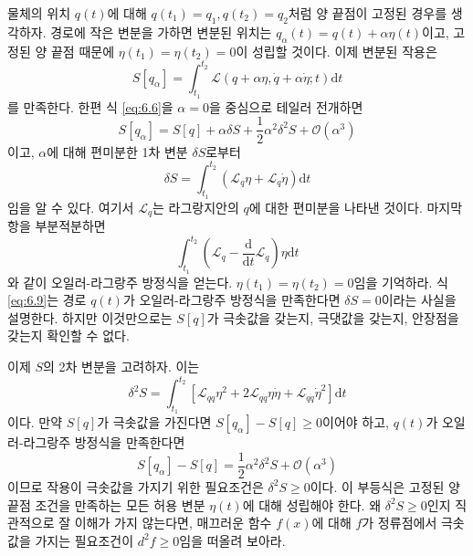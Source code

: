 \documentclass[chapter, oneside, b5paper]{oblivoir}
\theoremstyle{plain}
\theoremstyle{definition}
\theoremstyle{remark}
\begin{document}
물체의 위치 $q(t)$에 대해 $q(t_1) = q_1, q(t_2) = q_2$처럼 양 끝점이 고정된 경우를 생각하자. 경로에 작은 변분을 가하면 변분된 위치는 $q_{\alpha}(t) = q(t) + \alpha \eta(t)$이고, 고정된 양 끝점 때문에 $\eta(t_1) = \eta(t_2)=0$이 성립할 것이다. 이제 변분된 작용은
\begin{equation}
    S[q_\alpha] = \int_{t_1}^{t_2} \mathcal{L}(q+\alpha \eta, \dot{q}+\alpha \dot{\eta} ; t) \mathrm{d}t
    \label{eq:6.6}
\end{equation}
를 만족한다. 한편 식 \ref{eq:6.6}을 $\alpha = 0$을 중심으로 테일러 전개하면
\begin{equation}
    S[q_{\alpha}] = S[q] + \alpha \delta S + \frac{1}{2} \alpha^2 \delta^2S + \mathcal{O}(\alpha^3)
\end{equation}
이고, $\alpha$에 대해 편미분한 1차 변분 $\delta S$로부터
\begin{equation}
    \delta S = \int_{t_1}^{t_2} (\mathcal{L}_q \eta + \mathcal{L}_{\dot{q}} \dot{\eta}) \mathrm{d}t
\end{equation}
임을 알 수 있다. 여기서 $\mathcal{L}_q$는 라그랑지안의 $q$에 대한 편미분을 나타낸 것이다. 마지막 항을 부분적분하면
\begin{equation}
    \int_{t_1}^{t_2} \left(\mathcal{L}_q  - \frac{\mathrm{d}}{\mathrm{d}t}\mathcal{L}_{\dot{q}} \right) \eta \mathrm{d}t
    \label{eq:6.9}
\end{equation}
와 같이 오일러-라그랑주 방정식을 얻는다. $\eta(t_1) = \eta(t_2)=0$임을 기억하라. 식 \ref{eq:6.9}는 경로 $q(t)$가 오일러-라그랑주 방정식을 만족한다면 $\delta S = 0$이라는 사실을 설명한다. 하지만 이것만으로는 $S[q]$가 극솟값을 갖는지, 극댓값을 갖는지, 안장점을 갖는지 확인할 수 없다.

이제 $S$의 2차 변분을 고려하자. 이는
\begin{equation}
    \delta^2 S = \int_{t_1}^{t_2} [\mathcal{L}_{qq} \eta^2 + 2\mathcal{L}_{q\dot{q}} \eta \dot{\eta} + \mathcal{L}_{\dot{q}\dot{q}}\dot{\eta}^
    2] \mathrm{d}t
    \label{eq:6.10}
\end{equation}
이다. 만약 $S[q]$가 극솟값을 가진다면 $S[q_{\alpha}] - S[q] \geq 0$이어야 하고, $q(t)$가 오일러-라그랑주 방정식을 만족한다면
\begin{equation}
    S[q_{\alpha}] - S[q] = \frac{1}{2} \alpha^2 \delta^2S + \mathcal{O}(\alpha^3)
\end{equation}
이므로 작용이 극솟값을 가지기 위한 필요조건은 $\delta^2 S \geq 0$이다. 이 부등식은 고정된 양 끝점 조건을 만족하는 모든 허용 변분 $\eta(t)$에 대해 성립해야 한다. 왜 $\delta^2S \geq 0$인지 직관적으로 잘 이해가 가지 않는다면, 매끄러운 함수 $f(x)$에 대해 $f$가 정류점에서 극솟값을 가지는 필요조건이 $d^2f \geq 0$임을 떠올려 보아라.
\end{document}
